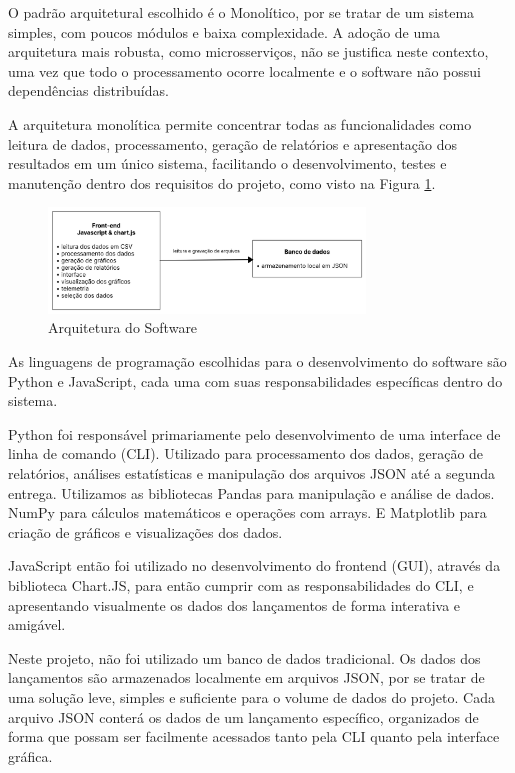 \begin{samepage}

O padrão arquitetural escolhido é o Monolítico, por se tratar de um sistema simples, com poucos módulos e baixa complexidade. A adoção de uma arquitetura mais robusta, como microsserviços, não se justifica neste contexto, uma vez que todo o processamento ocorre localmente e o software não possui dependências distribuídas. 

A arquitetura monolítica permite concentrar todas as funcionalidades como leitura de dados, processamento, geração de relatórios e apresentação dos resultados em um único sistema, facilitando o desenvolvimento, testes e manutenção dentro dos requisitos do projeto, como visto na Figura \ref{fig_arquitetura}.

\begin{figure}[H]
	\centering
	\includegraphics[width=0.75\textwidth,height=0.5\textheight,keepaspectratio]{figuras/arquitetura2.png}
	\caption{Arquitetura do Software}
	\label{fig_arquitetura}
\end{figure}

As linguagens de programação escolhidas para o desenvolvimento do software são Python e JavaScript, cada uma com suas responsabilidades específicas dentro do sistema.

Python foi responsável primariamente pelo desenvolvimento de uma interface de linha de comando (CLI). Utilizado para processamento dos dados, geração de relatórios, análises estatísticas e manipulação dos arquivos JSON até a segunda entrega. Utilizamos as bibliotecas Pandas para manipulação e análise de dados. NumPy para cálculos matemáticos e operações com arrays. E Matplotlib para criação de gráficos e visualizações dos dados.

JavaScript então foi utilizado no desenvolvimento do frontend (GUI), através da biblioteca Chart.JS, para então cumprir com as responsabilidades do CLI, e apresentando visualmente os dados dos lançamentos de forma interativa e amigável.

Neste projeto, não foi utilizado um banco de dados tradicional. Os dados dos lançamentos são armazenados localmente em arquivos JSON, por se tratar de uma solução leve, simples e suficiente para o volume de dados do projeto. Cada arquivo JSON conterá os dados de um lançamento específico, organizados de forma que possam ser facilmente acessados tanto pela CLI quanto pela interface gráfica.

\end{samepage}

